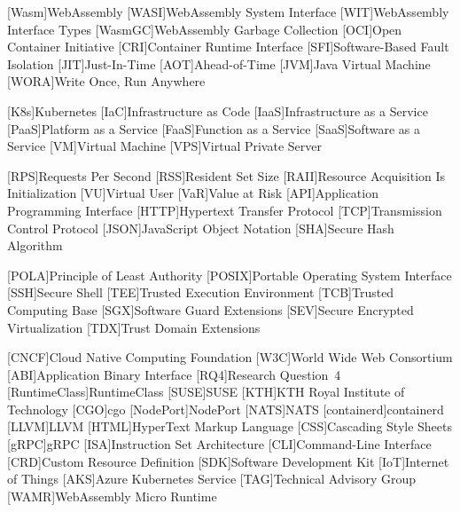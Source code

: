 
[Wasm]{WebAssembly}
[WASI]{WebAssembly System Interface}
[WIT]{WebAssembly Interface Types}
[WasmGC]{WebAssembly Garbage Collection}
[OCI]{Open Container Initiative}
[CRI]{Container Runtime Interface}
[SFI]{Software-Based Fault Isolation}
[JIT]{Just-In-Time}
[AOT]{Ahead-of-Time}
[JVM]{Java Virtual Machine}
[WORA]{Write Once, Run Anywhere}

[K8s]{Kubernetes}
[IaC]{Infrastructure as Code}
[IaaS]{Infrastructure as a Service}
[PaaS]{Platform as a Service}
[FaaS]{Function as a Service}
[SaaS]{Software as a Service}
[VM]{Virtual Machine}
[VPS]{Virtual Private Server}

[RPS]{Requests Per Second}
[RSS]{Resident Set Size}
[RAII]{Resource Acquisition Is Initialization}
[VU]{Virtual User}
[VaR]{Value at Risk}
[API]{Application Programming Interface}
[HTTP]{Hypertext Transfer Protocol}
[TCP]{Transmission Control Protocol}
[JSON]{JavaScript Object Notation}
[SHA]{Secure Hash Algorithm}

[POLA]{Principle of Least Authority}
[POSIX]{Portable Operating System Interface}
[SSH]{Secure Shell}
[TEE]{Trusted Execution Environment}
[TCB]{Trusted Computing Base}
[SGX]{Software Guard Extensions}
[SEV]{Secure Encrypted Virtualization}
[TDX]{Trust Domain Extensions}

[CNCF]{Cloud Native Computing Foundation}
[W3C]{World Wide Web Consortium}
[ABI]{Application Binary Interface}
[RQ4]{Research Question~4}
[RuntimeClass]{RuntimeClass}
[SUSE]{SUSE}
[KTH]{KTH Royal Institute of Technology}
[CGO]{cgo}
[NodePort]{NodePort}
[NATS]{NATS}
[containerd]{containerd}
[LLVM]{LLVM}
[HTML]{HyperText Markup Language}
[CSS]{Cascading Style Sheets}
[gRPC]{gRPC}
[ISA]{Instruction Set Architecture}
[CLI]{Command-Line Interface}
[CRD]{Custom Resource Definition}
[SDK]{Software Development Kit}
[IoT]{Internet of Things}
[AKS]{Azure Kubernetes Service}
[TAG]{Technical Advisory Group}
[WAMR]{WebAssembly Micro Runtime}


